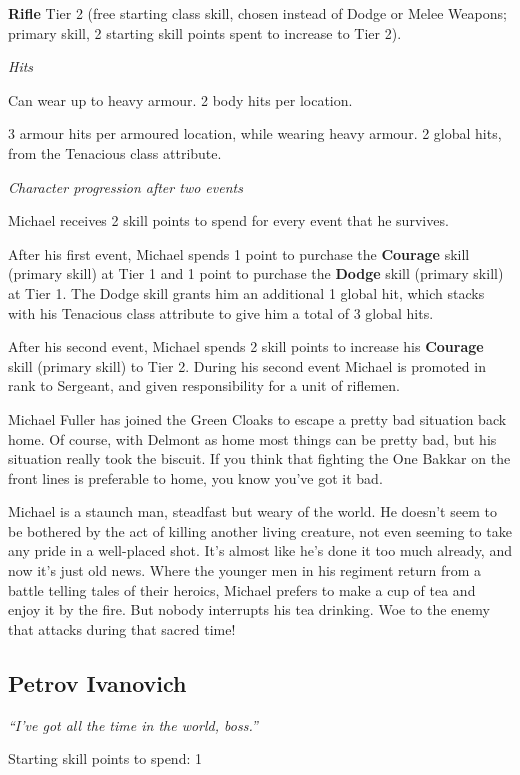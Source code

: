 \documentclass{scrbook}
\begin{document}
\textbf{Rifle} Tier 2 (free starting class skill, chosen instead of Dodge or Melee Weapons; primary skill, 2 starting skill points spent to increase to Tier 2).

\textit{Hits}

Can wear up to heavy armour. 2 body hits per location.

3 armour hits per armoured location, while wearing heavy armour. 2 global hits, from the Tenacious class attribute.

\textit{Character progression after two events}

Michael receives 2 skill points to spend for every event that he survives.

After his first event, Michael spends 1 point to purchase the \textbf{Courage} skill (primary skill) at Tier 1 and 1 point to purchase the \textbf{Dodge} skill (primary skill) at Tier 1. The Dodge skill grants him an additional 1 global hit, which stacks with his Tenacious class attribute to give him a total of 3 global hits.

After his second event, Michael spends 2 skill points to increase his \textbf{Courage} skill (primary skill) to Tier 2. During his second event Michael is promoted in rank to Sergeant, and given responsibility for a unit of riflemen.

Michael Fuller has joined the Green Cloaks to escape a pretty bad situation back home. Of course, with Delmont as home most things can be pretty bad, but his situation really took the biscuit. If you think that fighting the One Bakkar on the front lines is preferable to home, you know you've got it bad.

Michael is a staunch man, steadfast but weary of the world. He doesn't seem to be bothered by the act of killing another living creature, not even seeming to take any pride in a well-placed shot. It's almost like he's done it too much already, and now it's just old news. Where the younger men in his regiment return from a battle telling tales of their heroics, Michael prefers to make a cup of tea and enjoy it by the fire. But nobody interrupts his tea drinking. Woe to the enemy that attacks during that sacred time!

\subsection{Petrov Ivanovich}

\textit{``I've got all the time in the world, boss.''}

Starting skill points to spend: 1
\end{document}
